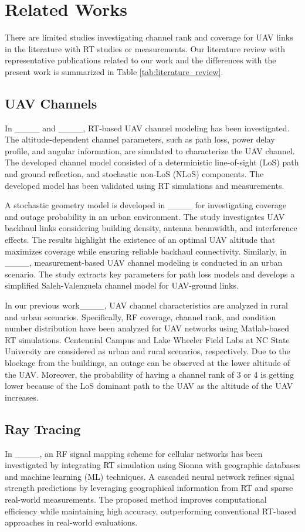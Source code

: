 \section{Related Works}
\label{ch:related_works}
There are limited studies investigating channel rank and coverage for UAV links in the literature with RT studies or measurements. Our literature review with representative publications related to our work and the differences with the present work is summarized in Table \ref{tab:literature_review}.

\subsection{UAV Channels}
In ____ and ____, RT-based UAV channel modeling has been investigated. The altitude-dependent channel parameters, such as path loss, power delay profile, and angular information, are simulated to characterize the UAV channel. The developed channel model consisted of a deterministic line-of-sight (LoS) path and ground reflection, and stochastic non-LoS (NLoS) components. The developed model has been validated using RT simulations and measurements.  

A stochastic geometry model is developed in ____ for investigating coverage and outage probability in an urban environment. The study investigates UAV backhaul links considering building density, antenna beamwidth, and interference effects. The results highlight the existence of an optimal UAV altitude that maximizes coverage while ensuring reliable backhaul connectivity. Similarly, in ____, measurement-based UAV channel modeling is conducted in an urban scenario. The study extracts key parameters for path loss models and develops a simplified Saleh-Valenzuela channel model for UAV-ground links.

In our previous work____, UAV channel characteristics are analyzed in rural and urban scenarios. Specifically, RF coverage, channel rank, and condition number distribution have been analyzed for UAV networks using Matlab-based RT simulations. Centennial Campus and Lake Wheeler Field Labs at NC State University are considered as urban and rural scenarios, respectively. Due to the blockage from the buildings, an outage can be observed at the lower altitude of the UAV. Moreover, the probability of having a channel rank of 3 or 4 is getting lower because of the LoS dominant path to the UAV as the altitude of the UAV increases.


\subsection{Ray Tracing}
In ____, an RF signal mapping scheme for cellular networks has been investigated by integrating RT simulation using Sionna with geographic databases and machine learning (ML) techniques. A cascaded neural network refines signal strength predictions by leveraging geographical information from RT and sparse real-world measurements. The proposed method improves computational efficiency while maintaining high accuracy, outperforming conventional RT-based approaches in real-world evaluations.

